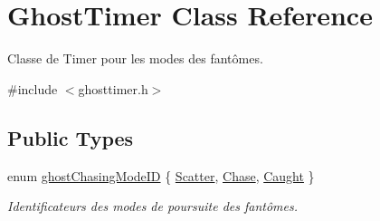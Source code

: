 \hypertarget{class_ghost_timer}{}\section{Ghost\+Timer Class Reference}
\label{class_ghost_timer}


Classe de Timer pour les modes des fantômes.  




{\ttfamily \#include $<$ghosttimer.\+h$>$}

\subsection*{Public Types}
\begin{DoxyCompactItemize}
\item 
enum \hyperlink{class_ghost_timer_ab0d7214f12a7a296873f7066da0dd376}{ghost\+Chasing\+Mode\+I\+D} \{ \hyperlink{class_ghost_timer_ab0d7214f12a7a296873f7066da0dd376a6e29811e4274cb53894ef379a7dcf352}{Scatter}, 
\hyperlink{class_ghost_timer_ab0d7214f12a7a296873f7066da0dd376a87af289aa3e260abda0563f393ef21a9}{Chase}, 
\hyperlink{class_ghost_timer_ab0d7214f12a7a296873f7066da0dd376a3e6680ea135bad0232bff23046d10b77}{Caught}
 \}\begin{DoxyCompactList}\small\item\em Identificateurs des modes de poursuite des fantômes. \end{DoxyCompactList}
\end{DoxyCompactItemize}
